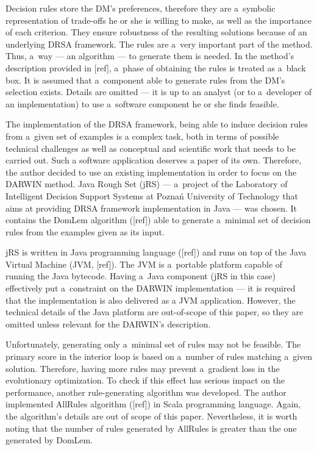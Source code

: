 Decision rules store the DM's preferences, therefore they are a~symbolic
representation of trade-offs he or she is willing to make, as well as the
importance of each criterion. They ensure robustness of the resulting
solutions because of an underlying DRSA framework. The rules are a~very
important part of the method. Thus, a~way --- an algorithm --- to generate
them is needed. In the method's description provided in [ref], a~phase of
obtaining the rules is treated as a~black box. It is assumed that a~component
able to generate rules from the DM's selection exists. Details are omitted ---
it is up to an analyst (or to a~developer of an implementation) to use
a~software component he or she finds feasible.

The implementation of the DRSA framework, being able to induce decision rules
from a~given set of examples is a complex task, both in terms of possible
technical challenges as well as conceptual and scientific work that needs to
be carried out. Such a software application deserves a paper of its
own. Therefore, the author decided to use an existing implementation in order
to focus on the DARWIN method. Java Rough Set (jRS) --- a~project of the
Laboratory of Intelligent Decision Support Systems at Poznań University of
Technology that aims at providing DRSA framework implementation in Java ---
was chosen. It contains the DomLem algorithm ([ref]) able to generate
a~minimal set of decision rules from the examples given as its input.

jRS is written in Java programming language ([ref]) and runs on top of the
Java Virtual Machine (JVM, [ref]). The JVM is a~portable platform capable of
running the Java bytecode. Having a~Java component (jRS in this case)
effectively put a~constraint on the DARWIN implementation --- it is required
that the implementation is also delivered as a JVM application. However, the
technical details of the Java platform are out-of-scope of this paper, so they
are omitted unless relevant for the DARWIN's description.

Unfortunately, generating only a~minimal set of rules may not be feasible. The
primary score in the interior loop is based on a~number of rules matching
a~given solution. Therefore, having more rules may prevent a~gradient loss in
the evolutionary optimization. To check if this effect has serious impact on
the performance, another rule-generating algorithm was developed. The author
implemented AllRules algorithm ([ref]) in Scala programming language. Again,
the algorithm's details are out of scope of this paper. Nevertheless, it is
worth noting that the number of rules generated by AllRules is greater than
the one generated by DomLem.

